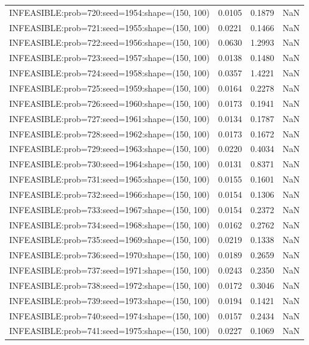 \begin{longtable}{lccc}
INFEASIBLE:prob=720:seed=1954:shape=(150, 100) &   0.0105 &  0.1879 &    NaN \\
INFEASIBLE:prob=721:seed=1955:shape=(150, 100) &   0.0221 &  0.1466 &    NaN \\
INFEASIBLE:prob=722:seed=1956:shape=(150, 100) &   0.0630 &  1.2993 &    NaN \\
INFEASIBLE:prob=723:seed=1957:shape=(150, 100) &   0.0138 &  0.1480 &    NaN \\
INFEASIBLE:prob=724:seed=1958:shape=(150, 100) &   0.0357 &  1.4221 &    NaN \\
INFEASIBLE:prob=725:seed=1959:shape=(150, 100) &   0.0164 &  0.2278 &    NaN \\
INFEASIBLE:prob=726:seed=1960:shape=(150, 100) &   0.0173 &  0.1941 &    NaN \\
INFEASIBLE:prob=727:seed=1961:shape=(150, 100) &   0.0134 &  0.1787 &    NaN \\
INFEASIBLE:prob=728:seed=1962:shape=(150, 100) &   0.0173 &  0.1672 &    NaN \\
INFEASIBLE:prob=729:seed=1963:shape=(150, 100) &   0.0220 &  0.4034 &    NaN \\
INFEASIBLE:prob=730:seed=1964:shape=(150, 100) &   0.0131 &  0.8371 &    NaN \\
INFEASIBLE:prob=731:seed=1965:shape=(150, 100) &   0.0155 &  0.1601 &    NaN \\
INFEASIBLE:prob=732:seed=1966:shape=(150, 100) &   0.0154 &  0.1306 &    NaN \\
INFEASIBLE:prob=733:seed=1967:shape=(150, 100) &   0.0154 &  0.2372 &    NaN \\
INFEASIBLE:prob=734:seed=1968:shape=(150, 100) &   0.0162 &  0.2762 &    NaN \\
INFEASIBLE:prob=735:seed=1969:shape=(150, 100) &   0.0219 &  0.1338 &    NaN \\
INFEASIBLE:prob=736:seed=1970:shape=(150, 100) &   0.0189 &  0.2659 &    NaN \\
INFEASIBLE:prob=737:seed=1971:shape=(150, 100) &   0.0243 &  0.2350 &    NaN \\
INFEASIBLE:prob=738:seed=1972:shape=(150, 100) &   0.0172 &  0.3046 &    NaN \\
INFEASIBLE:prob=739:seed=1973:shape=(150, 100) &   0.0194 &  0.1421 &    NaN \\
INFEASIBLE:prob=740:seed=1974:shape=(150, 100) &   0.0157 &  0.2434 &    NaN \\
INFEASIBLE:prob=741:seed=1975:shape=(150, 100) &   0.0227 &  0.1069 &    NaN \\

\end{longtable}
